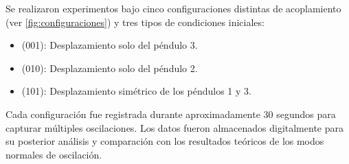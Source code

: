 Se realizaron experimentos bajo cinco configuraciones distintas de acoplamiento (ver \cref{fig:configuraciones}) y tres tipos de condiciones iniciales:

\begin{itemize}
    \item (001): Desplazamiento solo del péndulo 3.
    \item (010): Desplazamiento solo del péndulo 2.
    \item (101): Desplazamiento simétrico de los péndulos 1 y 3.
\end{itemize}

Cada configuración fue registrada durante aproximadamente 30 segundos para capturar múltiples oscilaciones.
Los datos fueron almacenados digitalmente para su posterior análisis y comparación con los resultados teóricos de los modos normales de oscilación.
